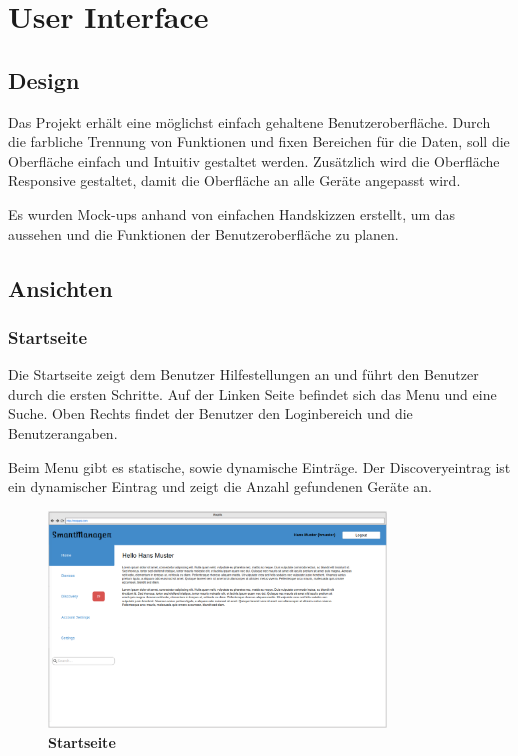\chapter{User Interface}


\section{Design}
Das Projekt erhält eine möglichst einfach gehaltene Benutzeroberfläche. Durch die farbliche Trennung von Funktionen und fixen Bereichen für die Daten, soll die Oberfläche einfach und Intuitiv gestaltet werden. Zusätzlich wird die Oberfläche Responsive gestaltet, damit die Oberfläche an alle Geräte angepasst wird.

Es wurden Mock-ups anhand von einfachen Handskizzen erstellt, um das aussehen und die Funktionen der Benutzeroberfläche zu planen.

\section{Ansichten}
\subsection{Startseite}
Die Startseite zeigt dem Benutzer Hilfestellungen an und führt den Benutzer durch die ersten Schritte. Auf der Linken Seite befindet sich das Menu und eine Suche. Oben Rechts findet der Benutzer den Loginbereich und die Benutzerangaben.

Beim Menu gibt es statische, sowie dynamische Einträge. Der Discoveryeintrag ist ein dynamischer Eintrag und zeigt die Anzahl gefundenen Geräte an.
\begin{figure} [H]
	\begin{center}
	\includegraphics[width=0.80\textwidth]{images/home.PNG}
	\caption{\textbf{Startseite}}
	\label{Bild Referenz}
	\end{center}
\end{figure}


